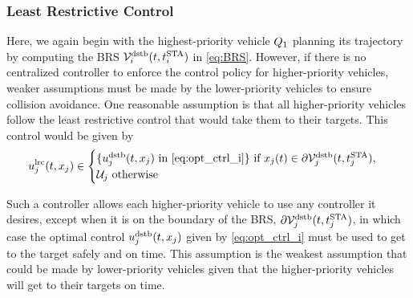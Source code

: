 \subsubsection{Least Restrictive Control\label{sec:lrc}}
Here, we again begin with the highest-priority vehicle $Q_1$ planning its trajectory by computing the BRS $\mathcal{V}_i^\text{dstb}(t, t^\text{STA}_i)$ in \eqref{eq:BRS}. However, if there is no centralized controller to enforce the control policy for higher-priority vehicles, weaker assumptions must be made by the lower-priority vehicles to ensure collision avoidance. One reasonable assumption is that all higher-priority vehicles follow the least restrictive control that would take them to their targets. This control would be given by 
\vspace{-0.2cm}
\begin{equation}
\label{eq:lrctrl} %
\ctrl_j^\text{lrc}(t, \state_j)\in \begin{cases} \{\ctrl_j^\text{dstb}(t, \state_j) \text{ in } \eqref{eq:opt_ctrl_i}\} \text{ if } \state_j(t)\in \partial \brs_j^\text{dstb}(t, \sta_j), \\
\cset_j  \text{ otherwise}
\end{cases}
\vspace{-0.1cm}
\end{equation}

Such a controller allows each higher-priority vehicle to use any controller it desires, except when it is on the boundary of the BRS, $\partial \mathcal{V}_j^\text{dstb}(t, t^\text{STA}_j)$, in which case the optimal control $u_j^\text{dstb}(t, x_j)$ given by \eqref{eq:opt_ctrl_i} must be used to get to the target safely and on time. This assumption is the weakest assumption that could be made by lower-priority vehicles given that the higher-priority vehicles will get to their targets on time.

